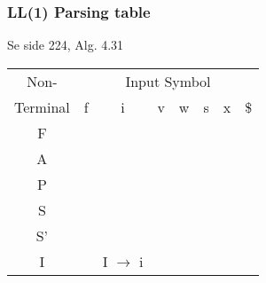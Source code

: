 \documentclass{article}
\begin{document}
\subsubsection*{LL(1) Parsing table}
Se side 224, Alg. 4.31

\begin{tabular}{|c|c|c|c|c|c|c|c|}
\hline
Non- & \multicolumn{7}{c|}{Input Symbol}\\
\cline{2-8}
Terminal & f & i & v & w & s & x & \$ \\
\hline
\hline
F  & & & & & & & \\
\hline
A  & & & & & & & \\
\hline
P  & & & & & & & \\
\hline
S  & & & & & & & \\
\hline
S' & & & & & & & \\
\hline
I  & & I $\rightarrow$ i & & & & & \\
\hline
\end{tabular}


\printindex
\end{document}

